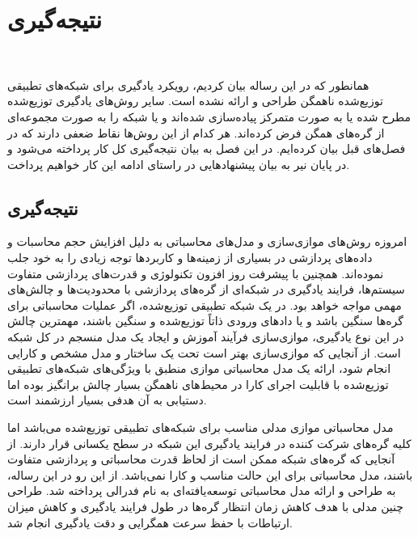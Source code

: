 \chapter{نتیجه‌گیری}
\newpage
‎\renewcommand{\baselinestretch}{2}\normalsize‎
\label{Conclusion}

همانطور که در این رساله بیان کردیم، رویکرد یادگیری برای شبکه‌های تطبیقی توزیع‌شده ناهمگن طراحی و ارائه نشده است. سایر روش‌های یادگیری توزیع‌شده مطرح شده یا به صورت متمرکز پیاده‌سازی شده‌اند و یا شبکه را به صورت مجموعه‌ای از گره‌های همگن فرض کرده‌اند. هر کدام از این روش‌ها نقاط ضعفی دارند که در فصل‌های قبل بیان کرده‌ایم. در این فصل به بیان نتیجه‌گیری کل کار پرداخته می‌شود و در پایان نیر به بیان پیشنهادهایی در راستای ادامه این کار خواهیم پرداخت. 

\section{نتیجه‌گیری}
امروزه روش‌های موازی‌سازی و مدل‌های محاسباتی به دلیل افزایش حجم محاسبات و داده‌های پردازشی در بسیاری از زمینه‌ها و کاربردها توجه زیادی را به خود جلب نموده‌اند. همچنین با پیشرفت روز افزون تکنولوژی و قدرت‌های پردازشی متفاوت سیستم‌ها، فرایند یادگیری در شبکه‌‌ای از گره‌های پردازشی با محدودیت‌ها و چالش‌های مهمی مواجه خواهد بود. در یک شبکه تطبیقی توزیع‌شده، اگر عملیات محاسباتی برای گره‌ها سنگین باشد و یا داد‌های ورودی ذاتاً توزیع‌شده و سنگین باشند، مهمترین چالش در این نوع یادگیری، موازی‌سازی فرآیند آموزش و ایجاد یک مدل منسجم در کل شبکه است.  از آنجایی که موازی‌سازی بهتر است تحت یک ساختار و مدل مشخص و کارایی انجام شود، ارائه یک مدل محاسباتی موازی منطبق با ویژگی‌های شبکه‌های تطبیقی توزیع‌شده با قابلیت اجرای کارا در محیط‌های ناهمگن بسیار چالش برانگیز بوده اما دستیابی به آن هدفی بسیار ارزشمند است. 

مدل محاسباتی موازی  مدلی مناسب برای شبکه‌های تطبیقی توزیع‌شده می‌باشد اما کلیه گره‌های شرکت کننده در فرایند یادگیری این شبکه در سطح یکسانی قرار دارند. از آنجایی که گره‌های شبکه ممکن است از لحاظ قدرت محاسباتی و پردازشی متفاوت باشند، مدل محاسباتی  برای این حالت مناسب و کارا نمی‌باشد. از این رو در این رساله، به طراحی و ارائه مدل محاسباتی توسعه‌یافته‌ای به نام  فدرالی پرداخته شد. طراحی چنین مدلی با هدف کاهش زمان انتظار گره‌ها در طول فرایند یادگیری و کاهش میزان ارتباطات با حفظ سرعت همگرایی و دقت یادگیری انجام شد. 

